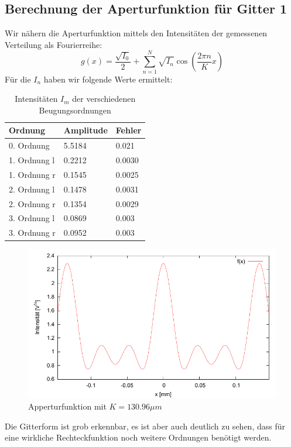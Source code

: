 \subsection{Berechnung der Aperturfunktion f\"ur Gitter 1}

Wir nähern die Aperturfunktion mittels den Intensit\"aten der gemessenen Verteilung als Fourierreihe:
$$g(x) = \frac{\sqrt{I_0}}{2} + \sum_{n=1}^N \sqrt{I_n}\cos\left(\frac{2\pi n}{K}x \right)$$
F\"ur die $I_n$ haben wir folgende Werte ermittelt:

\begin{table}[H]
\centering
\begin{tabular}{lll}
 \toprule
Ordnung & Amplitude & Fehler \\
\midrule
0. Ordnung   & 5.5184 & 0.021 \\
1. Ordnung l & 0.2212 & 0.0030 \\
1. Ordnung r & 0.1545 & 0.0025 \\
2. Ordnung l & 0.1478 & 0.0031 \\
2. Ordnung r & 0.1354 & 0.0029 \\
3. Ordnung l & 0.0869 & 0.003 \\
3. Ordnung r & 0.0952 & 0.003 \\
\bottomrule
\end{tabular}
\caption{Intensitäten $I_m$ der verschiedenen Beugungsordnungen}
\end{table}


\begin{figure}[H]
 \includegraphics{Bilder/appertur.pdf}
\caption{Apperturfunktion mit $K = 130.96 \mu m $}
\end{figure}
Die Gitterform ist grob erkennbar, es ist aber auch deutlich zu sehen, dass für eine wirkliche Rechteckfunktion noch weitere Ordnungen benötigt werden.


